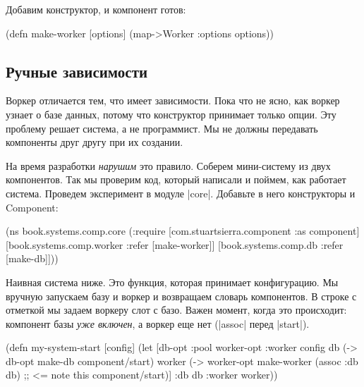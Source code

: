 Добавим конструктор, и компонент готов:

\begin{english}
  \begin{clojure}
(defn make-worker
  [options]
  (map->Worker {:options options}))
  \end{clojure}
\end{english}

\subsection{Ручные зависимости}

Воркер отличается тем, что имеет зависимости. Пока что не ясно, как воркер
узнает о базе данных, потому что конструктор принимает только опции. Эту
проблему решает система, а не программист. Мы не должны передавать компоненты
друг другу при их создании.

На время разработки \emph{нарушим} это правило. Соберем мини-систему из двух
компонентов. Так мы проверим код, который написали и поймем, как работает
система. Проведем эксперимент в модуле \spverb|core|. Добавьте в него
конструкторы и Component:

\begin{english}
  \begin{clojure}
(ns book.systems.comp.core
  (:require
   [com.stuartsierra.component :as component]
   [book.systems.comp.worker :refer [make-worker]]
   [book.systems.comp.db :refer [make-db]]))
  \end{clojure}
\end{english}

Наивная система ниже. Это функция, которая принимает конфигурацию. Мы вручную
запускаем базу и воркер и возвращаем словарь компонентов. В строке с отметкой мы
задаем воркеру слот с базо. Важен момент, когда это происходит: компонент базы
\emph{уже включен}, а воркер еще нет (\spverb|assoc| перед \spverb|start|).

\begin{english}
  \begin{clojure}
(defn my-system-start
  [config]
  (let [{db-opt :pool
         worker-opt :worker} config
        db (-> db-opt
               make-db
               component/start)
        worker (-> worker-opt
                   make-worker
                   (assoc :db db) ;; <= note this
                   component/start)]
    {:db db :worker worker}))
  \end{clojure}
\end{english}

